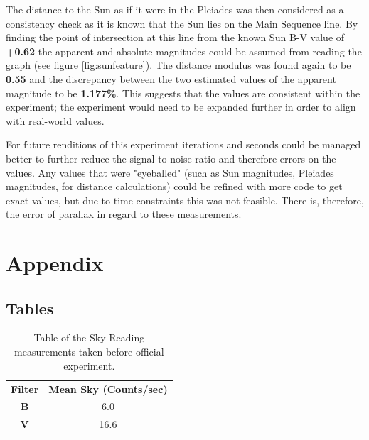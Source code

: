 \documentclass[12pt]{article}
\begin{document}
The distance to the Sun as if it were in the Pleiades was then considered as a consistency check as it is known that the Sun lies on the Main Sequence line. By finding the point of intersection
at this line from the known Sun B-V value of \textbf{+0.62} the apparent and absolute magnitudes could be assumed from reading the graph (see figure \ref{fig:sunfeature}). The distance modulus was found
again to be \textbf{0.55} and the discrepancy between the two estimated values of the apparent magnitude to be \textbf{1.177\%}. This suggests that the values are consistent within the experiment; the experiment would need to
be expanded further in order to align with real-world values.

For future renditions of this experiment iterations and seconds could be managed better to further reduce the signal to noise ratio and therefore errors on the values.
Any values that were "eyeballed" (such as Sun magnitudes, Pleiades magnitudes, for distance calculations) could be refined with more code to get exact values, but due to time constraints
this was not feasible. There is, therefore, the error of parallax in regard to these measurements.

\newpage



 \label{sec:ref}

\vspace{1.5cm}

\listoffigures

\listoftables

\section*{Appendix} \label{sec:A}

\subsection*{Tables}

\begin{table}[H]
    \centering
    \caption{\centering Table of the Sky Reading measurements taken before official experiment.}

    \begin{tabular}{c||c}
    \textbf{Filter} & \textbf{Mean Sky (Counts/sec)} \\
    \textbf{B}      & 6.0                            \\
    \textbf{V}      & 16.6                          
    \end{tabular}
\end{table}
\end{document}
